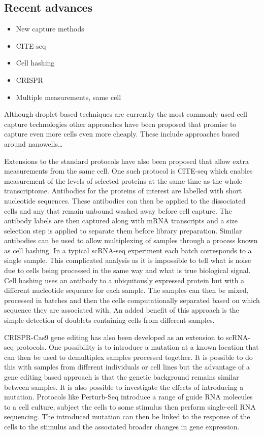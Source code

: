 \documentclass[11pt,a4paper,titlepage,twoside,openright]{style/unimelbthesis}
\theoremstyle{definition}
\theoremstyle{definition}
\theoremstyle{definition}
\theoremstyle{remark}
\begin{document}
\begin{mainmatter}
\hypertarget{recent-advances}{%
\subsection{Recent advances}\label{recent-advances}}

\begin{itemize}
\tightlist
\item
  New capture methods
\item
  CITE-seq
\item
  Cell hashing
\item
  CRISPR
\item
  Multiple measurements, same cell
\end{itemize}

Although droplet-based techniques are currently the most commonly used cell capture technologies other approaches have been proposed that promise to capture even more cells even more cheaply. These include approaches based around nanowells\ldots{}

Extensions to the standard protocols have also been proposed that allow extra measurements from the same cell. One such protocol is CITE-seq which enables measurement of the levels of selected proteins at the same time as the whole transcriptome. Antibodies for the proteins of interest are labelled with short nucleotide sequences. These antibodies can then be applied to the dissociated cells and any that remain unbound washed away before cell capture. The antibody labels are then captured along with mRNA transcripts and a size selection step is applied to separate them before library preparation. Similar antibodies can be used to allow multiplexing of samples through a process known as cell hashing. In a typical scRNA-seq experiment each batch corresponds to a single sample. This complicated analysis as it is impossible to tell what is noise due to cells being processed in the same way and what is true biological signal. Cell hashing uses an antibody to a ubiquitously expressed protein but with a different nucleotide sequence for each sample. The samples can then be mixed, processed in batches and then the cells computationally separated based on which sequence they are associated with. An added benefit of this approach is the simple detection of doublets containing cells from different samples.

CRISPR-Cas9 gene editing has also been developed as an extension to scRNA-seq protocols. One possibility is to introduce a mutation at a known location that can then be used to demultiplex samples processed together. It is possible to do this with samples from different individuals or cell lines but the advantage of a gene editing based approach is that the genetic background remains similar between samples. It is also possible to investigate the effects of introducing a mutation. Protocols like Perturb-Seq introduce a range of guide RNA molecules to a cell culture, subject the cells to some stimulus then perform single-cell RNA sequencing. The introduced mutation can then be linked to the response of the cells to the stimulus and the associated broader changes in gene expression.


\end{mainmatter}
\end{document}

